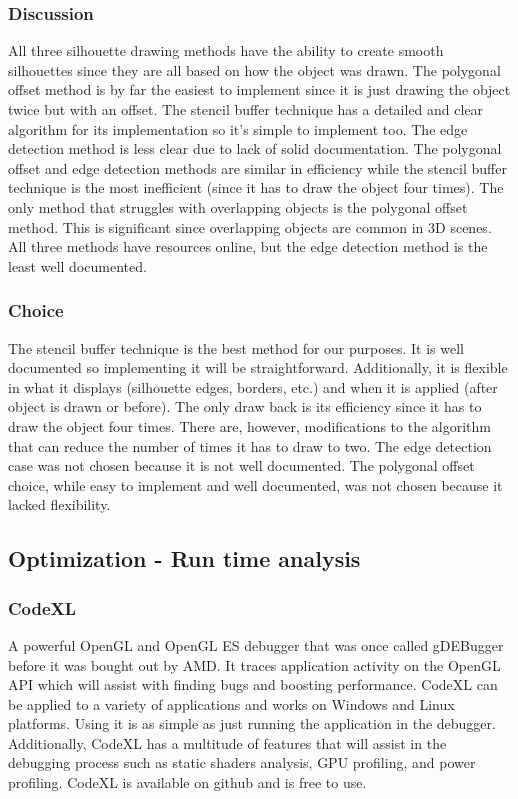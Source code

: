 \documentclass[10pt,journal,compsoc,draftclsnofoot]{IEEEtran}
\begin{document}
\subsubsection{Discussion}
All three silhouette drawing methods have the ability to create smooth silhouettes since they are all based on how the object was drawn.
The polygonal offset method is by far the easiest to implement since it is just drawing the object twice but with an offset.
The stencil buffer technique has a detailed and clear algorithm for its implementation so it's simple to implement too.
The edge detection method is less clear due to lack of solid documentation.
The polygonal offset and edge detection methods are similar in efficiency while the stencil buffer technique is the most inefficient (since it has to draw the object four times).
The only method that struggles with overlapping objects is the polygonal offset method. 
This is significant since overlapping objects are common in 3D scenes.
All three methods have resources online, but the edge detection method is the least well documented.

\subsubsection{Choice}
The stencil buffer technique is the best method for our purposes.
It is well documented so implementing it will be straightforward.
Additionally, it is flexible in what it displays (silhouette edges, borders, etc.) and when it is applied (after object is drawn or before). 
The only draw back is its efficiency since it has to draw the object four times.
There are, however, modifications to the algorithm that can reduce the number of times it has to draw to two. \cite{siledges}
The edge detection case was not chosen because it is not well documented.
The polygonal offset choice, while easy to implement and well documented, was not chosen because it lacked flexibility.

\newpage

\subsection{Optimization - Run time analysis}

\subsubsection{CodeXL}
A powerful OpenGL and OpenGL ES debugger that was once called gDEBugger before it was bought out by AMD.
It traces application activity on the OpenGL API which will assist with finding bugs and boosting performance.
CodeXL can be applied to a variety of applications and works on Windows and Linux platforms.
Using it is as simple as just running the application in the debugger.
Additionally, CodeXL has a multitude of features that will assist in the debugging process such as static shaders analysis, GPU profiling, and power profiling. \cite{codexl}
CodeXL is available on github and is free to use.
\end{document}
